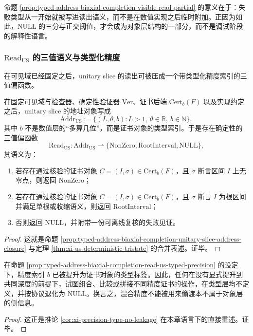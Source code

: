 命题 \ref{prop:typed-address-biaxial-completion-visible-read-partial} 的意义在于：失败类型从一开始就被写进读出语义，而不是在数值实现之后临时附加。正因为如此，\(\mathrm{NULL}\) 的三分与正交阈值，才会成为对象层结构的一部分，而不是调试阶段的解释性语言。

\subsubsection{\texorpdfstring{$\mathrm{Read}_{\mathrm{US}}$}{Read\_US} 的三值语义与类型化精度}\label{subsubsec:typed-address-biaxial-completion-read-us-typed-precision}
在可见域已经固定之后，unitary slice 的读出可被压成一个带类型化精度索引的三值偏函数。

\begin{proposition}[三值语义与类型化精度]\label{prop:typed-address-biaxial-completion-read-us-typed-precision}
在固定可见域与检查器、确定性验证器 \(\mathrm{Ver}\)、证书后端 \(\mathrm{Cert}_b(F)\) 以及实现约定之后，unitary slice 的地址对象写成
\[
\mathrm{Addr}_{\mathrm{US}}
:=
\{(L,\theta,b):L>1,\ \theta\in\mathbb R,\ b\in\mathbb N\},
\]
其中 \(b\) 不是数值层的“多算几位”，而是证书对象的类型索引。于是存在确定性的三值偏函数
\[
\mathrm{Read}_{\mathrm{US}}:
\mathrm{Addr}_{\mathrm{US}}
\rightharpoonup
\{\mathrm{NonZero},\mathrm{RootInterval},\mathrm{NULL}\},
\]
其语义为：
\begin{enumerate}
  \item 若存在通过核验的证书对象 \(C=(I,\sigma)\in\mathrm{Cert}_b(F)\)，且 \(\sigma\) 断言区间 \(I\) 上无零点，则返回 \(\mathrm{NonZero}\)；
  \item 若存在通过核验的证书对象 \(C=(I,\sigma)\in\mathrm{Cert}_b(F)\)，且 \(\sigma\) 断言 \(I\) 为根区间并满足单根或收缩语义，则返回 \(\mathrm{RootInterval}\)；
  \item 否则返回 \(\mathrm{NULL}\)，并附带一份可离线复核的失败见证。
\end{enumerate}
\end{proposition}
\begin{proof}
这就是命题 \ref{prop:typed-address-biaxial-completion-unitary-slice-address-closure} 与定理 \ref{thm:xi-us-deterministic-tristate} 的合并表述。证毕。
\end{proof}

\begin{corollary}[显式提升原则与信息不泄漏]\label{cor:typed-address-biaxial-completion-explicit-lifting}
在命题 \ref{prop:typed-address-biaxial-completion-read-us-typed-precision} 的设定下，精度索引 \(b\) 已被提升为证书对象的类型标签。因此，任何在没有显式提升到共同深度的前提下，试图组合、比较或拼接不同精度证书的操作，在类型层均不定义，并按协议退化为 \(\mathrm{NULL}\)。换言之，混合精度不能被用来偷渡本不属于对象层的侧信息。
\end{corollary}
\begin{proof}
这正是推论 \ref{cor:xi-precision-type-no-leakage} 在本章语言下的直接重述。证毕。
\end{proof}

